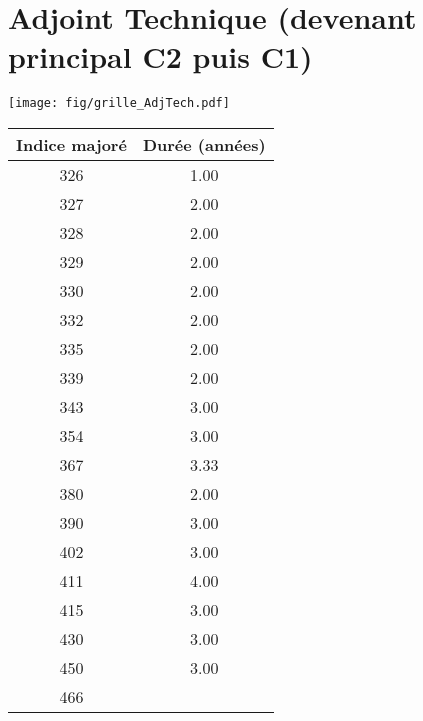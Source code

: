 \newpage 
 
\chapter{Adjoint Technique (devenant principal C2 puis C1)} 

\begin{minipage}{0.55\linewidth}\texttt{[image: fig/grille\_AdjTech.pdf]}\end{minipage} 
\begin{minipage}{0.3\linewidth} 
 \begin{center} 

\begin{tabular}[htb]{|c|c|} 
\hline 
 Indice majoré &  Durée (années) \\ 
\hline \hline 
 326 &  1.00 \\ 
\hline 
 327 &  2.00 \\ 
\hline 
 328 &  2.00 \\ 
\hline 
 329 &  2.00 \\ 
\hline 
 330 &  2.00 \\ 
\hline 
 332 &  2.00 \\ 
\hline 
 335 &  2.00 \\ 
\hline 
 339 &  2.00 \\ 
\hline 
 343 &  3.00 \\ 
\hline 
 354 &  3.00 \\ 
\hline 
 367 &  3.33 \\ 
\hline 
 380 &  2.00 \\ 
\hline 
 390 &  3.00 \\ 
\hline 
 402 &  3.00 \\ 
\hline 
 411 &  4.00 \\ 
\hline 
 415 &  3.00 \\ 
\hline 
 430 &  3.00 \\ 
\hline 
 450 &  3.00 \\ 
\hline 
 466 &   \\ 
\hline 
\hline 
\end{tabular} 
\end{center} 
 \end{minipage} 

~\\ 
 


   
 \localtableofcontents 


